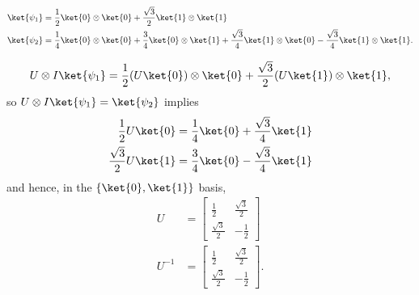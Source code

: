 




\begin{align*}
	\ket{\psi_1} &= \frac{1}{2} \ket{0} \otimes \ket{0} + \frac{\sqrt{3}}{2} \ket{1} \otimes \ket{1}\\
	\ket{\psi_2} &= \frac{1}{4} \ket{0} \otimes \ket{0} + \frac{3}{4} \ket{0} \otimes \ket{1} + \frac{\sqrt{3}}{4} \ket{1} \otimes \ket{0} - \frac{\sqrt{3}}{4} \ket{1} \otimes \ket{1}.
\end{align*}

\begin{align*}
	U \otimes I \ket{\psi_1} = \frac{1}{2} (U \ket{0}) \otimes \ket{0} + \frac{\sqrt{3}}{2} (U \ket{1}) \otimes \ket{1},
\end{align*}
so $U \otimes I \ket{\psi_1} = \ket{\psi_2}$ implies
\begin{align*}
	\frac{1}{2} U \ket{0} &= \frac{1}{4} \ket{0} + \frac{\sqrt{3}}{4} \ket{1}\\
	\frac{\sqrt{3}}{2} U \ket{1} &= \frac{3}{4} \ket{0} - \frac{\sqrt{3}}{4} \ket{1}
\end{align*}
and hence, in the $\{\ket{0}, \ket{1} \}$ basis,
\begin{align*}
	U &=
	\begin{bmatrix}
		\frac{1}{2} & \frac{\sqrt{3}}{2}\\
		\frac{\sqrt{3}}{2} & -\frac{1}{2}
	\end{bmatrix}\\
	U^{-1} &=
	\begin{bmatrix}
		\frac{1}{2} & \frac{\sqrt{3}}{2}\\
		\frac{\sqrt{3}}{2} & -\frac{1}{2}
	\end{bmatrix}.
\end{align*}












